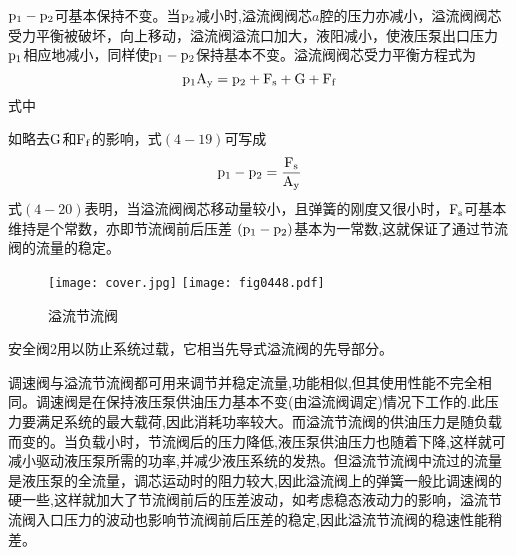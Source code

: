 
$\rm p_1- p_2$可基本保持不变。当$\rm p_2$减小时,溢流阀阀芯$a$腔的压力亦减小，溢流阀阀芯受力平衡被破坏，向上移动，溢流阀溢流口加大，液阳减小，使液压泵出口压力$\rm p_1$相应地减小，同样使$\rm p_1-p_2$保持基本不变。溢流阀阀芯受力平衡方程式为\\ \vspace{-0.7cm}
\begin{equation}
\rm p_1A_y=p_2+F_s+G+F_f 
\end{equation}\vspace{-0.9cm}
\noindent 式中 \quad
{}

如略去$\rm G$和$\rm F_f$的影响，式$(4-19)$可写成
\begin{equation}
\rm p_1- p_2=\frac{F_s}{ A_y}
\end{equation}
式$(4-20)$表明，当溢流阀阀芯移动量较小，且弹簧的刚度又很小时，$\rm F_s$可基本维持是个常数，亦即节流阀前后压差 $\rm (p_1- p_2)$基本为一常数,这就保证了通过节流阀的流量的稳定。

\begin{figure}[!hbt]
\centering
\ifOpenSource
\texttt{[image: cover.jpg]}
\else
\texttt{[image: fig0448.pdf]}
\fi
\caption{溢流节流阀}
\label{fig:fig0448}
\end{figure}

安全阀2用以防止系统过载，它相当先导式溢流阀的先导部分。

调速阀与溢流节流阀都可用来调节并稳定流量,功能相似,但其使用性能不完全相同。调速阀是在保持液压泵供油压力基本不变(由溢流阀调定)情况下工作的.此压力要满足系统的最大载荷,因此消耗功率较大。而溢流节流阀的供油压力是随负载而变的。当负载小时，节流阀后的压力降低,液压泵供油压力也随着下降,这样就可减小驱动液压泵所需的功率,并减少液压系统的发热。但溢流节流阀中流过的流量是液压泵的全流量，调芯运动时的阻力较大,因此溢流阀上的弹簧一般比调速阀的硬一些,这样就加大了节流阀前后的压差波动，如考虑稳态液动力的影响，溢流节流阀入口压力的波动也影响节流阀前后压差的稳定,因此溢流节流阀的稳速性能稍差。

